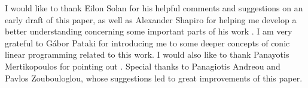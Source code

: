 \documentclass[11pt, twoside]{article}
\numberwithin{equation}{section}
\theoremstyle{definition}
\begin{document}
I would like to thank Eilon Solan for his helpful comments and suggestions on an early draft of this paper, as well as Alexander Shapiro for helping me develop a better understanding concerning some important parts of his work \cite{shapiro2001duality}. I am very grateful to G\'abor Pataki for introducing me to some deeper concepts of conic linear programming related to this work. I would also like to thank Panayotis Mertikopoulos for pointing out \cite{ickstadt2024semidefinite}. Special thanks to Panagiotis Andreou and Pavlos Zoubouloglou, whose suggestions led to great improvements of this paper.


%
\vspace{-0.5cm}
\end{document}
